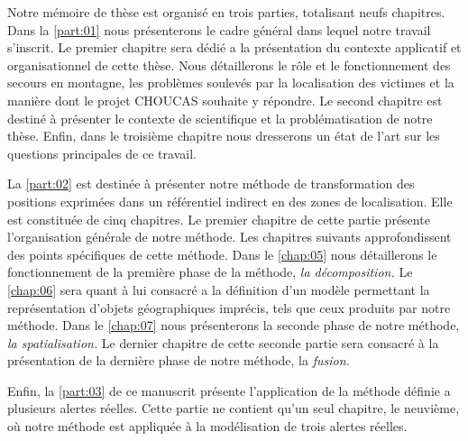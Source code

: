 

Notre mémoire de thèse est organisé en trois parties, totalisant neufs
chapitres. Dans la \autoref{part:01} nous présenterons le cadre
général dans lequel notre travail s'inscrit. Le premier chapitre sera
dédié a la présentation du contexte applicatif et organisationnel de
cette thèse. Nous détaillerons le rôle et le fonctionnement des
secours en montagne, les problèmes soulevés par la localisation des
victimes et la manière dont le projet CHOUCAS souhaite y répondre. Le
second chapitre est destiné à présenter le contexte de scientifique et
la problématisation de notre thèse. Enfin, dans le troisième chapitre
nous dresserons un état de l'art sur les questions principales de ce
travail.

La \autoref{part:02} est destinée à présenter notre méthode de
transformation des positions exprimées dans un référentiel indirect en
des zones de localisation. Elle est constituée de cinq chapitres. Le
premier chapitre de cette partie présente l’organisation générale de
notre méthode. Les chapitres suivants approfondissent des points
spécifiques de cette méthode. Dans le \autoref{chap:05} nous
détaillerons le fonctionnement de la première phase de la méthode,
\emph{la décomposition.} Le \autoref{chap:06} sera quant à lui
consacré a la définition d'un modèle permettant la représentation
d'objets géographiques imprécis, tels que ceux produits par notre
méthode. Dans le \autoref{chap:07} nous présenterons la seconde phase
de notre méthode, \emph{la spatialisation.} Le dernier chapitre de
cette seconde partie sera consacré à la présentation de la dernière
phase de notre méthode, la \emph{fusion.}

Enfin, la \autoref{part:03} de ce manuscrit présente l’application de
la méthode définie a plusieurs alertes réelles. Cette partie ne
contient qu'un seul chapitre, le neuvième, où notre méthode est
appliquée à la modélisation de trois alertes réelles.


